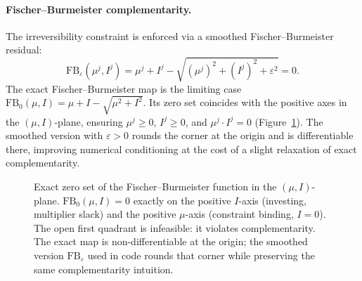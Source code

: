 \documentclass[11pt,a4paper]{report}
\begin{document}
\paragraph{Fischer--Burmeister complementarity.}\label{sec:irbc_fischer_burmeister}  The irreversibility constraint is enforced via a smoothed Fischer--Burmeister residual:
\begin{equation}
\mathrm{FB}_\varepsilon(\mu^j, I^j) = \mu^j + I^j - \sqrt{(\mu^j)^2 + (I^j)^2 + \varepsilon^2} = 0.
\end{equation}
The exact Fischer--Burmeister map is the limiting case $\mathrm{FB}_0(\mu,I)=\mu+I-\sqrt{\mu^2+I^2}$.  Its zero set coincides with the positive axes in the $(\mu, I)$-plane, ensuring $\mu^j \geq 0$, $I^j \geq 0$, and $\mu^j \cdot I^j = 0$ (Figure~\ref{fig:fb_zeroset}).  The smoothed version with $\varepsilon > 0$ rounds the corner at the origin and is differentiable there, improving numerical conditioning at the cost of a slight relaxation of exact complementarity.

\begin{figure}[ht]
\centering
{}
\caption{Exact zero set of the Fischer--Burmeister function in the $(\mu, I)$-plane.  $\mathrm{FB}_0(\mu, I) = 0$ exactly on the positive $I$-axis (investing, multiplier slack) and the positive $\mu$-axis (constraint binding, $I = 0$).  The open first quadrant is infeasible: it violates complementarity.  The exact map is non-differentiable at the origin; the smoothed version $\mathrm{FB}_\varepsilon$ used in code rounds that corner while preserving the same complementarity intuition.}
\label{fig:fb_zeroset}
\end{figure}
\end{document}
